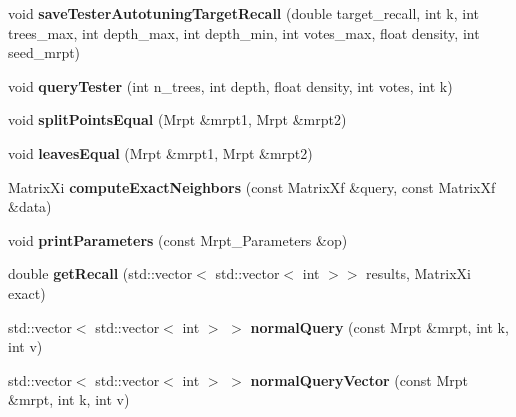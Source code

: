 \begin{DoxyCompactItemize}
\item 
\mbox{\label{class_mrpt_test_af4950dfd57a1ca45b864e0d93e2e5613}} 
void {\bfseries save\+Tester\+Autotuning\+Target\+Recall} (double target\+\_\+recall, int k, int trees\+\_\+max, int depth\+\_\+max, int depth\+\_\+min, int votes\+\_\+max, float density, int seed\+\_\+mrpt)
\item 
\mbox{\label{class_mrpt_test_a4d0c6652a6b8b7e23fc462e2c1915ac6}} 
void {\bfseries query\+Tester} (int n\+\_\+trees, int depth, float density, int votes, int k)
\item 
\mbox{\label{class_mrpt_test_a1621d2f00e83347acf08c1ab149676dc}} 
void {\bfseries split\+Points\+Equal} (Mrpt \&mrpt1, Mrpt \&mrpt2)
\item 
\mbox{\label{class_mrpt_test_a92177af2ff7703a6e918d8a2657c3a8c}} 
void {\bfseries leaves\+Equal} (Mrpt \&mrpt1, Mrpt \&mrpt2)
\item 
\mbox{\label{class_mrpt_test_a3e5e1209e8780954de1dd64355097399}} 
Matrix\+Xi {\bfseries compute\+Exact\+Neighbors} (const Matrix\+Xf \&query, const Matrix\+Xf \&data)
\item 
\mbox{\label{class_mrpt_test_aa3de00bf750bed73b893959bea7d680b}} 
void {\bfseries print\+Parameters} (const Mrpt\+\_\+\+Parameters \&op)
\item 
\mbox{\label{class_mrpt_test_af6e587c4f3c7d31719b40685fbedc61b}} 
double {\bfseries get\+Recall} (std\+::vector$<$ std\+::vector$<$ int $>$$>$ results, Matrix\+Xi exact)
\item 
\mbox{\label{class_mrpt_test_a64456333c8478e6c1d33d922b467d8f8}} 
std\+::vector$<$ std\+::vector$<$ int $>$ $>$ {\bfseries normal\+Query} (const Mrpt \&mrpt, int k, int v)
\item 
\mbox{\label{class_mrpt_test_a9f4e07d231e79a00f9d84d4e0fbdf5db}} 
std\+::vector$<$ std\+::vector$<$ int $>$ $>$ {\bfseries normal\+Query\+Vector} (const Mrpt \&mrpt, int k, int v)
\item 
\mbox{\label{class_mrpt_test_aee2dbc061d3abacb21159eaab9265ed9}} 
$$
\end{DoxyCompactItemize}
